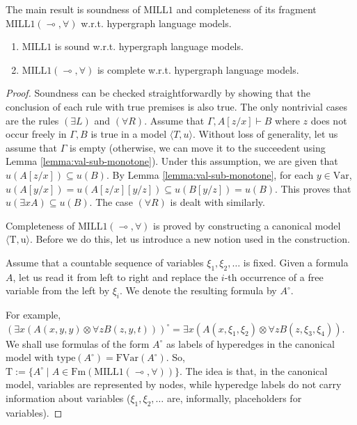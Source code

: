 \documentclass[a4paper,UKenglish,cleveref, autoref, thm-restate,pdfa]{lipics-v2021}
\newcommand{\eqdef}{:=}
\newcommand{\type}{\mathrm{type}}
\newcommand{\Var}{\mathrm{Var}}
\newcommand{\FVar}{\mathrm{FVar}}
\newcommand{\Fm}{\mathrm{Fm}}
\newcommand{\mconj}{\otimes}
\newcommand{\limpl}{\multimap}
\newcommand{\MILLFO}{\mathrm{MILL}1}
\begin{document}
The main result is soundness of $\MILLFO$ and completeness of its fragment $\MILLFO(\limpl,\forall)$ w.r.t. hypergraph language models.
\begin{theorem}\label{theorem:completeness}
	\leavevmode
	\begin{enumerate}
		\item $\MILLFO$ is sound w.r.t. hypergraph language models.
		\item $\MILLFO(\limpl,\forall)$ is complete w.r.t. hypergraph language models.
	\end{enumerate}
\end{theorem}
\begin{proof}
	Soundness can be checked straightforwardly by showing that the conclusion of each rule with true premises is also true. The only nontrivial cases are the rules $(\exists L)$ and $(\forall R)$. Assume that $\Gamma, A[z/x] \vdash B$ where $z$ does not occur freely in $\Gamma,B$ is true in a model $\langle T, u \rangle$. Without loss of generality, let us assume that $\Gamma$ is empty (otherwise, we can move it to the succeedent using Lemma \ref{lemma:val-sub-monotone}). Under this assumption, we are given that $u(A[z/x]) \subseteq u(B)$. By Lemma \ref{lemma:val-sub-monotone}, for each $y \in \Var$, $u(A[y/x]) = u(A[z/x][y/z]) \subseteq u(B[y/z]) = u(B)$. This proves that $u(\exists x A) \subseteq u(B)$. The case $(\forall R)$ is dealt with similarly.
	
	Completeness of $\MILLFO(\limpl,\forall)$ is proved by constructing a canonical model $\langle \mathrm{T}, \mathrm{u} \rangle$. Before we do this, let us introduce a new notion used in the construction. 
	\begin{definition}\label{definition:formula-circ}
		Assume that a countable sequence of variables $\xi_1,\xi_2,\ldots$ is fixed. Given a formula $A$, let us read it from left to right and replace the $i$-th occurrence of a free variable from the left by $\xi_i$. We denote the resulting formula by $A^\circ$. 
	\end{definition}
	For example, $(\exists x (A(x,y,y)\mconj \forall z B(z,y,t)))^\circ = \exists x (A(x,\xi_1,\xi_2)\mconj \forall z B(z,\xi_3,\xi_4))$. We shall use formulas of the form $A^\circ$ as labels of hyperedges in the canonical model with $\type(A^\circ) = \FVar(A^\circ)$. So, $\mathrm{T} \eqdef \{A^\circ \mid A \in \Fm(\MILLFO(\limpl,\forall))\}$. The idea is that, in the canonical model, variables are represented by nodes, while hyperedge labels do not carry information about variables ($\xi_1,\xi_2,\ldots$ are, informally, placeholders for variables). 
	

\end{proof}
\end{document}
